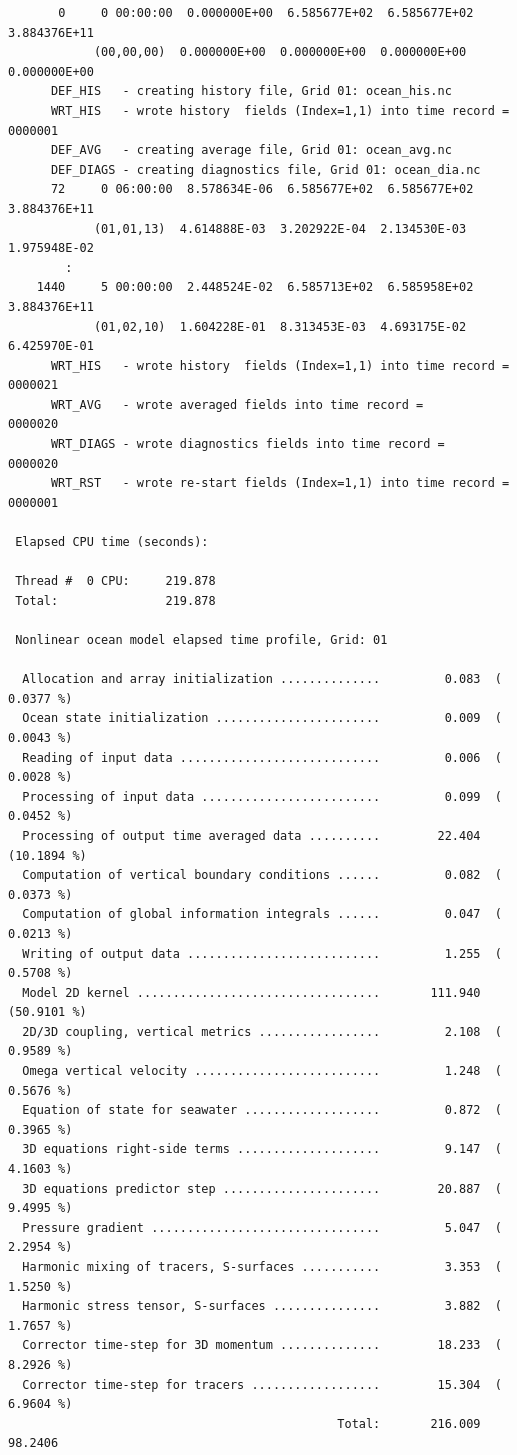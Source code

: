 \begin{verbatim}
       0     0 00:00:00  0.000000E+00  6.585677E+02  6.585677E+02  3.884376E+11
            (00,00,00)  0.000000E+00  0.000000E+00  0.000000E+00  0.000000E+00
      DEF_HIS   - creating history file, Grid 01: ocean_his.nc
      WRT_HIS   - wrote history  fields (Index=1,1) into time record = 0000001
      DEF_AVG   - creating average file, Grid 01: ocean_avg.nc
      DEF_DIAGS - creating diagnostics file, Grid 01: ocean_dia.nc
      72     0 06:00:00  8.578634E-06  6.585677E+02  6.585677E+02  3.884376E+11
            (01,01,13)  4.614888E-03  3.202922E-04  2.134530E-03  1.975948E-02
	    :
    1440     5 00:00:00  2.448524E-02  6.585713E+02  6.585958E+02  3.884376E+11
            (01,02,10)  1.604228E-01  8.313453E-03  4.693175E-02  6.425970E-01
      WRT_HIS   - wrote history  fields (Index=1,1) into time record = 0000021
      WRT_AVG   - wrote averaged fields into time record =             0000020
      WRT_DIAGS - wrote diagnostics fields into time record =          0000020
      WRT_RST   - wrote re-start fields (Index=1,1) into time record = 0000001

 Elapsed CPU time (seconds):

 Thread #  0 CPU:     219.878
 Total:               219.878

 Nonlinear ocean model elapsed time profile, Grid: 01

  Allocation and array initialization ..............         0.083  ( 0.0377 %)
  Ocean state initialization .......................         0.009  ( 0.0043 %)
  Reading of input data ............................         0.006  ( 0.0028 %)
  Processing of input data .........................         0.099  ( 0.0452 %)
  Processing of output time averaged data ..........        22.404  (10.1894 %)
  Computation of vertical boundary conditions ......         0.082  ( 0.0373 %)
  Computation of global information integrals ......         0.047  ( 0.0213 %)
  Writing of output data ...........................         1.255  ( 0.5708 %)
  Model 2D kernel ..................................       111.940  (50.9101 %)
  2D/3D coupling, vertical metrics .................         2.108  ( 0.9589 %)
  Omega vertical velocity ..........................         1.248  ( 0.5676 %)
  Equation of state for seawater ...................         0.872  ( 0.3965 %)
  3D equations right-side terms ....................         9.147  ( 4.1603 %)
  3D equations predictor step ......................        20.887  ( 9.4995 %)
  Pressure gradient ................................         5.047  ( 2.2954 %)
  Harmonic mixing of tracers, S-surfaces ...........         3.353  ( 1.5250 %)
  Harmonic stress tensor, S-surfaces ...............         3.882  ( 1.7657 %)
  Corrector time-step for 3D momentum ..............        18.233  ( 8.2926 %)
  Corrector time-step for tracers ..................        15.304  ( 6.9604 %)
                                              Total:       216.009   98.2406


\end{verbatim}
